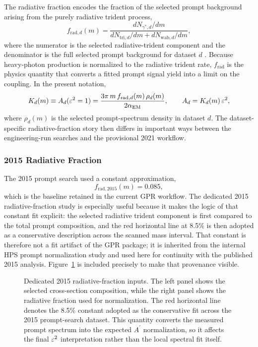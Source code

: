 The radiative fraction encodes the fraction of the selected prompt background arising
from the purely radiative trident process,
\begin{equation}
f_{\mathrm{rad},d}(m)
=
\frac{dN_{\gamma^\ast,d}/dm}{dN_{\mathrm{tri},d}/dm + dN_{\mathrm{wab},d}/dm},
\label{eq:frad-def}
\end{equation}
where the numerator is the selected radiative-trident component and the denominator is
the full selected prompt background for dataset $d$
\cite{HPS2015DarkPhoton,HPS2016PromptLong}. Because heavy-photon production is
normalized to the radiative trident rate, $f_{\mathrm{rad}}$ is the physics quantity
that converts a fitted prompt signal yield into a limit on the coupling. In the
present notation,
\begin{equation}
K_d(m) \equiv A_d(\varepsilon^2 = 1)
= \frac{3\pi\,m\,f_{\mathrm{rad},d}(m)\,\rho_d(m)}{2\alpha_{\mathrm{EM}}},
\qquad
A_d = K_d(m)\,\varepsilon^2,
\label{eq:kd-radfrac}
\end{equation}
where $\rho_d(m)$ is the selected prompt-spectrum density in dataset $d$. The
dataset-specific radiative-fraction story then differs in important ways between the
engineering-run searches and the provisional 2021 workflow.

\subsubsection{2015 Radiative Fraction}

The 2015 prompt search used a constant approximation,
\begin{equation}
f_{\mathrm{rad},2015}(m) = 0.085,
\end{equation}
which is the baseline retained in the current GPR workflow. The dedicated 2015
radiative-fraction study is especially useful because it makes the logic of that
constant fit explicit: the selected radiative trident component is first compared to
the total prompt composition, and the red horizontal line at 8.5\% is then adopted as
a conservative description across the scanned mass interval. That constant is therefore
not a fit artifact of the GPR package; it is inherited from the internal HPS prompt
normalization study and used here for continuity with the published 2015 analysis.
Figure~\ref{fig:2015-radfrac} is included precisely to make that provenance visible.

\begin{figure}[H]
\centering
{}
\caption{Dedicated 2015 radiative-fraction inputs. The left panel shows the selected
cross-section composition, while the right panel shows the radiative fraction used for
normalization. The red horizontal line denotes the 8.5\% constant adopted as the
conservative fit across the 2015 prompt-search dataset. This quantity converts the
measured prompt spectrum into the expected $A^\prime$ normalization, so it affects the
final $\varepsilon^2$ interpretation rather than the local spectral fit itself.}
\label{fig:2015-radfrac}
\end{figure}

